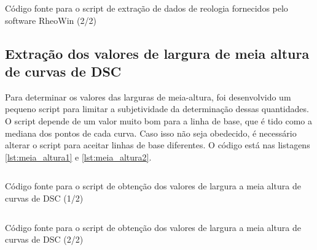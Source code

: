 \begin{listing}[H]
	\inputminted{python}{./python/extracao_reologia2.py}
	\caption{Código fonte para o script de extração de dados de reologia fornecidos pelo software RheoWin (2/2)} 
	\label{lst:extracao_reologia2}
\end{listing}

\subsection{Extração dos valores de largura de meia altura de curvas de DSC}

Para determinar os valores das larguras de meia-altura, foi desenvolvido um pequeno script para limitar a subjetividade da determinação dessas quantidades. O script depende de um valor muito bom para a linha de base, que é tido como a mediana dos pontos de cada curva. Caso isso não seja obedecido, é necessário alterar o script para aceitar linhas de base diferentes. O código está nas listagens \ref{lst:meia_altura1} e \ref{lst:meia_altura2}.

\begin{listing}[H]
	\inputminted{python}{./python/meia_altura1.py}
	\caption{Código fonte para o script de obtenção dos valores de largura a meia altura de curvas de DSC (1/2)} 
	\label{lst:meia_altura1}
\end{listing}

\begin{listing}[H]
	\inputminted{python}{./python/meia_altura2.py}
	\caption{Código fonte para o script de obtenção dos valores de largura a meia altura de curvas de DSC (2/2)} 
	\label{lst:meia_altura2}
\end{listing}

%
%
%
%
%
%
%
